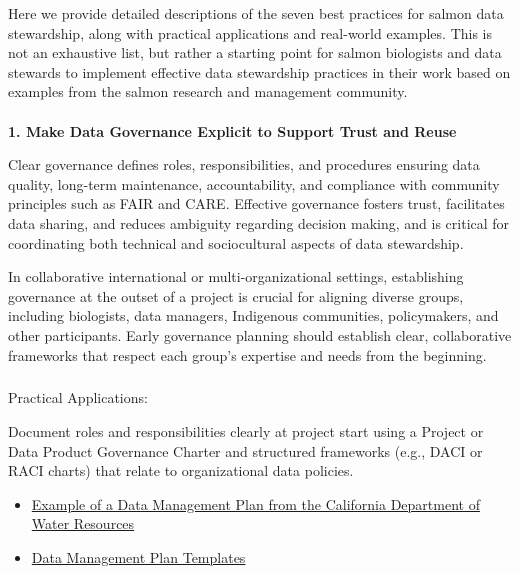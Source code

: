 \documentclass[
  letterpaper,
  DIV=11,
  numbers=noendperiod]{scrartcl}
\makeatletter
\let\oldparagraph\paragraph
\renewcommand{\paragraph}{
    \@ifstar
      \xxxParagraphStar
      \xxxParagraphNoStar
  }
\newcommand{\xxxParagraphStar}[1]{\oldparagraph*{#1}\mbox{}}
\newcommand{\xxxParagraphNoStar}[1]{\oldparagraph{#1}\mbox{}}
\let\oldsubparagraph\subparagraph
\renewcommand{\subparagraph}{
    \@ifstar
      \xxxSubParagraphStar
      \xxxSubParagraphNoStar
  }
\newcommand{\xxxSubParagraphStar}[1]{\oldsubparagraph*{#1}\mbox{}}
\newcommand{\xxxSubParagraphNoStar}[1]{\oldsubparagraph{#1}\mbox{}}
\makeatother
\begin{document}
Here we provide detailed descriptions of the seven best practices for
salmon data stewardship, along with practical applications and
real-world examples. This is not an exhaustive list, but rather a
starting point for salmon biologists and data stewards to implement
effective data stewardship practices in their work based on examples
from the salmon research and management community.

\paragraph{\texorpdfstring{\textbf{1. Make Data Governance Explicit to
Support Trust and
Reuse}}{1. Make Data Governance Explicit to Support Trust and Reuse}}\label{make-data-governance-explicit-to-support-trust-and-reuse}

Clear governance defines roles, responsibilities, and procedures
ensuring data quality, long-term maintenance, accountability, and
compliance with community principles such as FAIR and CARE. Effective
governance fosters trust, facilitates data sharing, and reduces
ambiguity regarding decision making, and is critical for coordinating
both technical and sociocultural aspects of data stewardship.

In collaborative international or multi-organizational settings,
establishing governance at the outset of a project is crucial for
aligning diverse groups, including biologists, data managers, Indigenous
communities, policymakers, and other participants. Early governance
planning should establish clear, collaborative frameworks that respect
each group's expertise and needs from the beginning.~

\subparagraph{Practical Applications:}\label{practical-applications}

Document roles and responsibilities clearly at project start using a
Project or Data Product Governance Charter and structured frameworks
(e.g., DACI or RACI charts) that relate to organizational data policies.

\begin{itemize}
\item
  \href{https://raw.githubusercontent.com/Br-Johnson/sdm-paper/refs/heads/main/examples/Cal_DMP.pdf}{Example
  of a Data Management Plan from the California Department of Water
  Resources}
\item
  \href{https://dmptool.org/public_templates?page=ALL}{Data Management
  Plan Templates}
\end{itemize}
\end{document}
